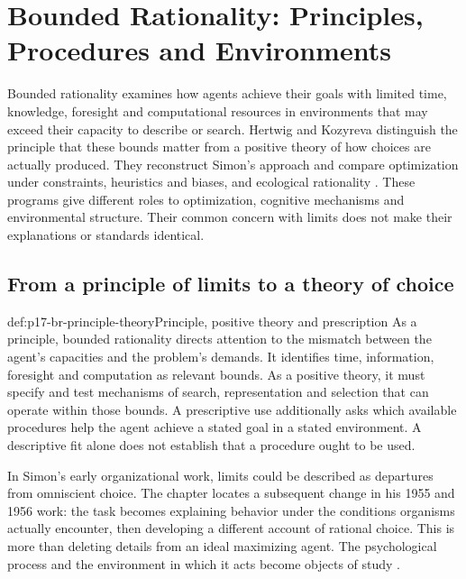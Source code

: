 \chapter{Bounded Rationality: Principles, Procedures and Environments}
\label{sec:p17-rationality-8-5}

Bounded rationality examines how agents achieve their goals with limited
time, knowledge, foresight and computational resources in environments
that may exceed their capacity to describe or search. Hertwig and
Kozyreva distinguish the principle that these bounds matter from a
positive theory of how choices are actually produced. They reconstruct
Simon's approach and compare optimization under constraints, heuristics
and biases, and ecological rationality
\cite[chapter~8.5, pp.~505--515]{HertwigKozyreva2021Bounded}.
These programs give different roles to optimization, cognitive mechanisms
and environmental structure. Their common concern with limits does not
make their explanations or standards identical.

\section{From a principle of limits to a theory of choice}
\label{sec:p17-br-foundations}

\begin{hbdefinition}{def:p17-br-principle-theory}{Principle, positive theory and prescription}
As a principle, bounded rationality directs attention to the mismatch
between the agent's capacities and the problem's demands. It identifies
time, information, foresight and computation as relevant bounds.
As a positive theory, it must specify and test mechanisms of search,
representation and selection that can operate within those bounds.
A prescriptive use additionally asks which available procedures help the
agent achieve a stated goal in a stated environment. A descriptive fit
alone does not establish that a procedure ought to be used.
\end{hbdefinition}

In Simon's early organizational work, limits could be described as
departures from omniscient choice. The chapter locates a subsequent
change in his 1955 and 1956 work: the task becomes explaining behavior
under the conditions organisms actually encounter, then developing a
different account of rational choice. This is more than deleting details
from an ideal maximizing agent. The psychological process and the
environment in which it acts become objects of study
\cite[pp.~505--506 and note~1]{HertwigKozyreva2021Bounded}.

